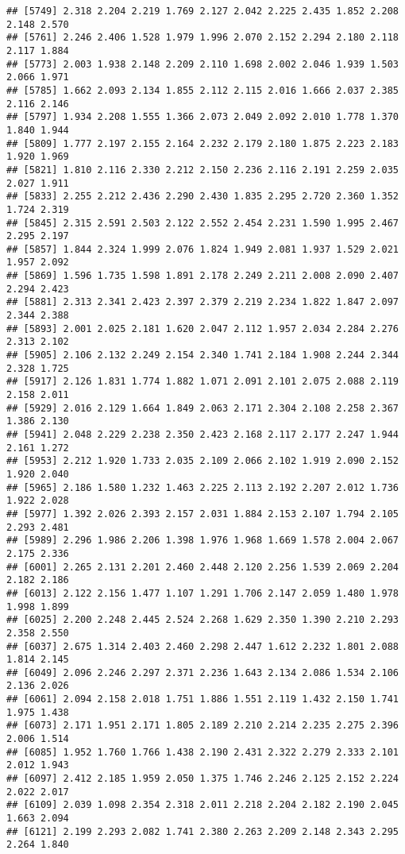 \documentclass[
]{article}
\begin{document}
\begin{verbatim}
## [5749] 2.318 2.204 2.219 1.769 2.127 2.042 2.225 2.435 1.852 2.208 2.148 2.570
## [5761] 2.246 2.406 1.528 1.979 1.996 2.070 2.152 2.294 2.180 2.118 2.117 1.884
## [5773] 2.003 1.938 2.148 2.209 2.110 1.698 2.002 2.046 1.939 1.503 2.066 1.971
## [5785] 1.662 2.093 2.134 1.855 2.112 2.115 2.016 1.666 2.037 2.385 2.116 2.146
## [5797] 1.934 2.208 1.555 1.366 2.073 2.049 2.092 2.010 1.778 1.370 1.840 1.944
## [5809] 1.777 2.197 2.155 2.164 2.232 2.179 2.180 1.875 2.223 2.183 1.920 1.969
## [5821] 1.810 2.116 2.330 2.212 2.150 2.236 2.116 2.191 2.259 2.035 2.027 1.911
## [5833] 2.255 2.212 2.436 2.290 2.430 1.835 2.295 2.720 2.360 1.352 1.724 2.319
## [5845] 2.315 2.591 2.503 2.122 2.552 2.454 2.231 1.590 1.995 2.467 2.295 2.197
## [5857] 1.844 2.324 1.999 2.076 1.824 1.949 2.081 1.937 1.529 2.021 1.957 2.092
## [5869] 1.596 1.735 1.598 1.891 2.178 2.249 2.211 2.008 2.090 2.407 2.294 2.423
## [5881] 2.313 2.341 2.423 2.397 2.379 2.219 2.234 1.822 1.847 2.097 2.344 2.388
## [5893] 2.001 2.025 2.181 1.620 2.047 2.112 1.957 2.034 2.284 2.276 2.313 2.102
## [5905] 2.106 2.132 2.249 2.154 2.340 1.741 2.184 1.908 2.244 2.344 2.328 1.725
## [5917] 2.126 1.831 1.774 1.882 1.071 2.091 2.101 2.075 2.088 2.119 2.158 2.011
## [5929] 2.016 2.129 1.664 1.849 2.063 2.171 2.304 2.108 2.258 2.367 1.386 2.130
## [5941] 2.048 2.229 2.238 2.350 2.423 2.168 2.117 2.177 2.247 1.944 2.161 1.272
## [5953] 2.212 1.920 1.733 2.035 2.109 2.066 2.102 1.919 2.090 2.152 1.920 2.040
## [5965] 2.186 1.580 1.232 1.463 2.225 2.113 2.192 2.207 2.012 1.736 1.922 2.028
## [5977] 1.392 2.026 2.393 2.157 2.031 1.884 2.153 2.107 1.794 2.105 2.293 2.481
## [5989] 2.296 1.986 2.206 1.398 1.976 1.968 1.669 1.578 2.004 2.067 2.175 2.336
## [6001] 2.265 2.131 2.201 2.460 2.448 2.120 2.256 1.539 2.069 2.204 2.182 2.186
## [6013] 2.122 2.156 1.477 1.107 1.291 1.706 2.147 2.059 1.480 1.978 1.998 1.899
## [6025] 2.200 2.248 2.445 2.524 2.268 1.629 2.350 1.390 2.210 2.293 2.358 2.550
## [6037] 2.675 1.314 2.403 2.460 2.298 2.447 1.612 2.232 1.801 2.088 1.814 2.145
## [6049] 2.096 2.246 2.297 2.371 2.236 1.643 2.134 2.086 1.534 2.106 2.136 2.026
## [6061] 2.094 2.158 2.018 1.751 1.886 1.551 2.119 1.432 2.150 1.741 1.975 1.438
## [6073] 2.171 1.951 2.171 1.805 2.189 2.210 2.214 2.235 2.275 2.396 2.006 1.514
## [6085] 1.952 1.760 1.766 1.438 2.190 2.431 2.322 2.279 2.333 2.101 2.012 1.943
## [6097] 2.412 2.185 1.959 2.050 1.375 1.746 2.246 2.125 2.152 2.224 2.022 2.017
## [6109] 2.039 1.098 2.354 2.318 2.011 2.218 2.204 2.182 2.190 2.045 1.663 2.094
## [6121] 2.199 2.293 2.082 1.741 2.380 2.263 2.209 2.148 2.343 2.295 2.264 1.840

\end{verbatim}
\end{document}
